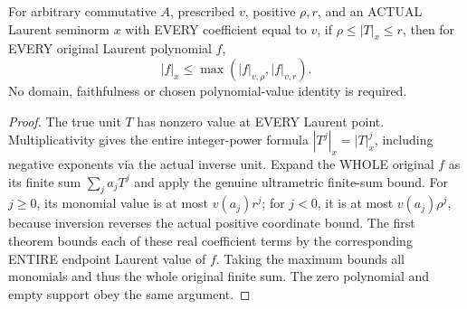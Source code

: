 \begin{theorem}
\label{spectrum:actual-laurent-annulus-endpoint-bound}
\leanok
For arbitrary commutative $A$, prescribed $v$, positive
$\rho,r$, and an ACTUAL Laurent seminorm $x$ with EVERY
coefficient equal to $v$, if
$\rho\le |T|_x\le r$, then for EVERY original Laurent
polynomial $f$,
\[
 |f|_x\le \max(|f|_{v,\rho},|f|_{v,r}).
\]
No domain, faithfulness or chosen polynomial-value identity is
required.
\end{theorem}
\begin{proof}
The true unit $T$ has nonzero value at EVERY Laurent point.
Multiplicativity gives the entire integer-power formula
$|T^j|_x=|T|_x^j$, including negative exponents via the
actual inverse unit. Expand the WHOLE original $f$ as its
finite sum $\sum_j a_jT^j$ and apply the genuine ultrametric
finite-sum bound. For $j\ge0$, its monomial value is at most
$v(a_j)r^j$; for $j<0$, it is at most
$v(a_j)\rho^j$, because inversion reverses the actual
positive coordinate bound. The first theorem bounds each of
these real coefficient terms by the corresponding ENTIRE
endpoint Laurent value of $f$. Taking the maximum bounds
all monomials and thus the whole original finite sum.
The zero polynomial and empty support obey the same argument.
\end{proof}
